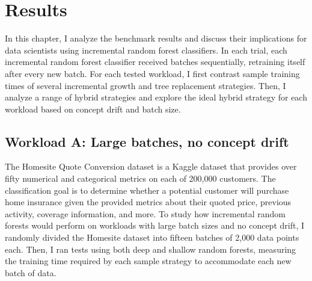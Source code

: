 \chapter{Results} In this chapter, I analyze the benchmark results and discuss
their implications for data scientists using incremental random forest
classifiers. In each trial, each incremental random forest classifier received
batches sequentially, retraining itself after every new batch. For each tested
workload, I first contrast sample training times of several incremental growth
and tree replacement strategies. Then, I analyze a range of hybrid strategies
and explore the ideal hybrid strategy for each workload based on concept drift
and batch size.



\section{Workload A: Large batches, no concept drift}

The Homesite Quote Conversion dataset is a Kaggle dataset that provides over
fifty numerical and categorical metrics on each of 200,000 customers. The
classification goal is to determine whether a potential customer will purchase
home insurance given the provided metrics about their quoted price, previous
activity, coverage information, and more. \cite{Homesite} To study how
incremental random forests would perform on workloads with large batch sizes
and no concept drift, I randomly divided the Homesite dataset into fifteen
batches of 2,000 data points each. Then, I ran tests using both deep and
shallow random forests, measuring the training time required by each sample
strategy to accommodate each new batch of data.

